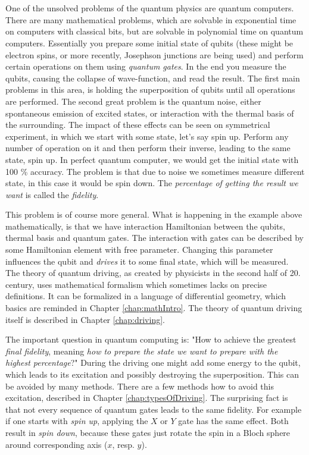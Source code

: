 \chapter*{}
One of the unsolved problems of the quantum physics are quantum computers. There are many mathematical problems, which are solvable in exponential time on computers with classical bits, but are solvable in polynomial time on quantum computers. Essentially you prepare some initial state of qubits (these might be electron spins, or more recently, Josephson junctions are being used) and perform certain operations on them using \emph{quantum gates}. In the end you measure the qubits, causing the collapse of wave-function, and read the result. The first main problems in this area, is holding the superposition of qubits until all operations are performed. The second great problem is the quantum noise, either spontaneous emission of excited states, or interaction with the thermal basis of the surrounding. The impact of these effects can be seen on symmetrical experiment, in which we start with some state, let's say spin up. Perform any number of operation on it and then perform their inverse, leading to the same state, spin up. In perfect quantum computer, we would get the initial state with 100 \% accuracy. The problem is that due to noise we sometimes measure different state, in this case it would be spin down. The \emph{percentage of getting the result we want} is called the \emph{fidelity}.

This problem is of course more general. What is happening in the example above mathematically, is that we have interaction Hamiltonian between the qubits, thermal basis and quantum gates. The interaction with gates can be described by some Hamiltonian element with free parameter. Changing this parameter influences the qubit and \emph{drives} it to some final state, which will be measured. The theory of quantum driving, as created by physicists in the second half of 20. century, uses mathematical formalism which sometimes lacks on precise definitions. It can be formalized in a language of differential geometry, which basics are reminded in Chapter \ref{chap:mathIntro}. The theory of quantum driving itself is described in Chapter \ref{chap:driving}.

The important question in quantum computing is: "How to achieve the greatest \emph{final fidelity}, meaning \emph{how to prepare the state we want to prepare with the highest percentage}?" During the driving one might add some energy to the qubit, which leads to its excitation and possibly destroying the superposition. This can be avoided by many methods. There are a few methods how to avoid this excitation, described in Chapter \ref{chap:typesOfDriving}. The surprising fact is that not every sequence of quantum gates leads to the same fidelity. For example if one starts with \emph{spin up}, applying the $X$ or $Y$ gate has the same effect. Both result in \emph{spin down}, because these gates just rotate the spin in a Bloch sphere around corresponding axis ($x$, resp. $y$).

